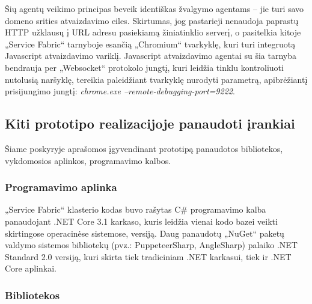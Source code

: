 Šių agentų veikimo principas beveik identiškas žvalgymo agentams -- jie turi savo domeno srities atvaizdavimo eiles. Skirtumas, jog pastarieji nenaudoja paprastų HTTP užklausų į URL adresu pasiekiamą žiniatinklio serverį, o pasitelkia kitoje „Service Fabric“ tarnyboje esančią „Chromium“ tvarkyklę, kuri turi integruotą Javascript atvaizdavimo variklį. Javascript atvaizdavimo agentai su šia tarnyba bendrauja per „Websocket“ protokolo jungtį, kuri leidžia tinklu kontroliuoti nutolusią naršyklę, tereikia paleidžiant tvarkyklę nurodyti parametrą, apibrėžiantį prisijungimo jungtį: \textit{chrome.exe --remote-debugging-port=9222}.

\subsection{Kiti prototipo realizacijoje panaudoti įrankiai}

Šiame poskyryje aprašomos įgyvendinant prototipą panaudotos bibliotekos, vykdomosios aplinkos, programavimo kalbos.

\subsubsection{Programavimo aplinka}

„Service Fabric“ klasterio kodas buvo rašytas C\# programavimo kalba panaudojant .NET Core 3.1 karkaso, kuris leidžia vienai kodo bazei veikti skirtingose operacinėse sistemose, versiją. Daug panaudotų „NuGet“ paketų valdymo sistemos bibliotekų (pvz.: PuppeteerSharp, AngleSharp) palaiko .NET Standard 2.0 versiją, kuri skirta tiek tradiciniam .NET karkasui, tiek ir .NET Core aplinkai.

\subsubsection{Bibliotekos}

